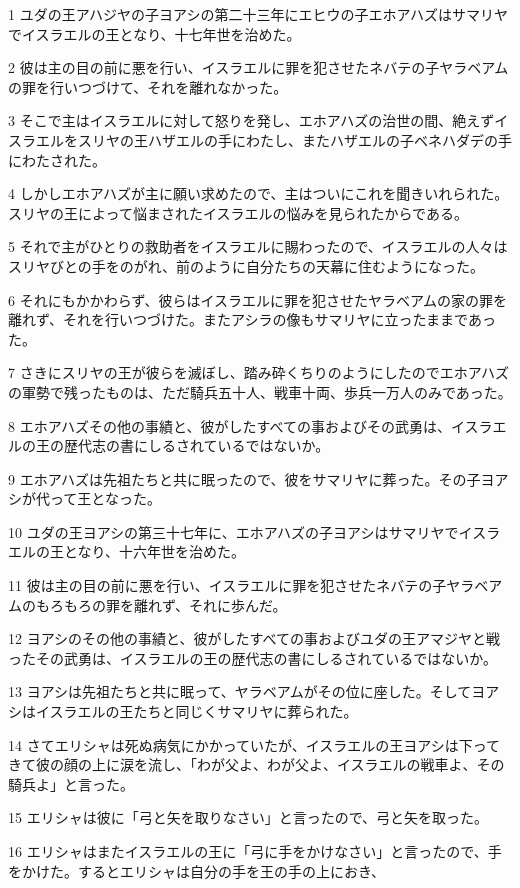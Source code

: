 \par 1 ユダの王アハジヤの子ヨアシの第二十三年にエヒウの子エホアハズはサマリヤでイスラエルの王となり、十七年世を治めた。
\par 2 彼は主の目の前に悪を行い、イスラエルに罪を犯させたネバテの子ヤラベアムの罪を行いつづけて、それを離れなかった。
\par 3 そこで主はイスラエルに対して怒りを発し、エホアハズの治世の間、絶えずイスラエルをスリヤの王ハザエルの手にわたし、またハザエルの子ベネハダデの手にわたされた。
\par 4 しかしエホアハズが主に願い求めたので、主はついにこれを聞きいれられた。スリヤの王によって悩まされたイスラエルの悩みを見られたからである。
\par 5 それで主がひとりの救助者をイスラエルに賜わったので、イスラエルの人々はスリヤびとの手をのがれ、前のように自分たちの天幕に住むようになった。
\par 6 それにもかかわらず、彼らはイスラエルに罪を犯させたヤラベアムの家の罪を離れず、それを行いつづけた。またアシラの像もサマリヤに立ったままであった。
\par 7 さきにスリヤの王が彼らを滅ぼし、踏み砕くちりのようにしたのでエホアハズの軍勢で残ったものは、ただ騎兵五十人、戦車十両、歩兵一万人のみであった。
\par 8 エホアハズその他の事績と、彼がしたすべての事およびその武勇は、イスラエルの王の歴代志の書にしるされているではないか。
\par 9 エホアハズは先祖たちと共に眠ったので、彼をサマリヤに葬った。その子ヨアシが代って王となった。
\par 10 ユダの王ヨアシの第三十七年に、エホアハズの子ヨアシはサマリヤでイスラエルの王となり、十六年世を治めた。
\par 11 彼は主の目の前に悪を行い、イスラエルに罪を犯させたネバテの子ヤラベアムのもろもろの罪を離れず、それに歩んだ。
\par 12 ヨアシのその他の事績と、彼がしたすべての事およびユダの王アマジヤと戦ったその武勇は、イスラエルの王の歴代志の書にしるされているではないか。
\par 13 ヨアシは先祖たちと共に眠って、ヤラベアムがその位に座した。そしてヨアシはイスラエルの王たちと同じくサマリヤに葬られた。
\par 14 さてエリシャは死ぬ病気にかかっていたが、イスラエルの王ヨアシは下ってきて彼の顔の上に涙を流し、「わが父よ、わが父よ、イスラエルの戦車よ、その騎兵よ」と言った。
\par 15 エリシャは彼に「弓と矢を取りなさい」と言ったので、弓と矢を取った。
\par 16 エリシャはまたイスラエルの王に「弓に手をかけなさい」と言ったので、手をかけた。するとエリシャは自分の手を王の手の上におき、
